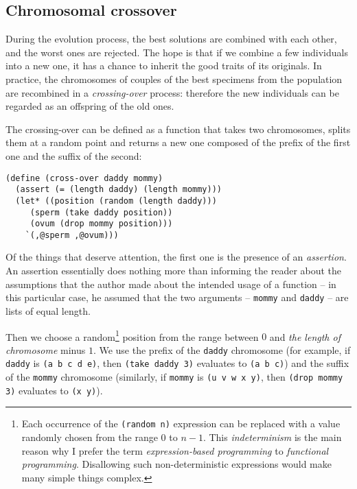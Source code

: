 \subsection{Chromosomal crossover}

During the evolution process, the best solutions are
combined with each other, and the worst ones are rejected.
The hope is that if we combine a few individuals into
a new one, it has a chance to inherit the good traits
of its originals. In practice, the chromosomes
of couples of the best specimens from the population
are recombined in a \textit{crossing-over} process:
therefore the new individuals can be regarded as
an offspring of the old ones.

The crossing-over can be defined as a function that takes
two chromosomes, splits them at a random point and returns
a new one composed of the prefix of the first one and
the suffix of the second:

\begin{Verbatim}[samepage=true]
(define (cross-over daddy mommy)
  (assert (= (length daddy) (length mommy)))
  (let* ((position (random (length daddy)))
	 (sperm (take daddy position))
	 (ovum (drop mommy position)))
    `(,@sperm ,@ovum)))
\end{Verbatim}

Of the things that deserve attention, the first one is the
presence of an \textit{assertion}. An assertion essentially
does nothing more than informing the reader about the
assumptions that the author made about the intended usage
of a function -- in this particular case, he assumed that
the two arguments -- \texttt{mommy} and \texttt{daddy}
-- are lists of equal length.

Then we choose a random\footnote{Each occurrence of the
\texttt{(random n)} expression can be replaced with
a value randomly chosen from the range $0$ to $n-1$.
This \textit{indeterminism} is the main reason why
I prefer the term \textit{expression-based programming}
to \textit{functional programming}. Disallowing such
non-deterministic expressions would make many simple
things complex.} position from the range between
$0$ and \textit{the length of chromosome} minus $1$.
We use the prefix of the \texttt{daddy} chromosome (for
example, if \texttt{daddy} is \texttt{(a\,b\,c\,d\,e)}, then
\texttt{(take daddy 3)} evaluates to \texttt{(a\,b\,c)})
and the suffix of the \texttt{mommy} chromosome (similarly,
if \texttt{mommy} is \texttt{(u\,v\,w\,x\,y)}, then
\texttt{(drop mommy 3)} evaluates to \texttt{(x\,y)}).

